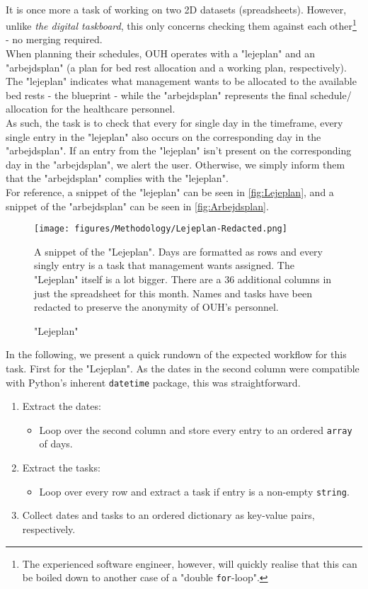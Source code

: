 \\
It is once more a task of working on two 2D datasets (spreadsheets). However, unlike \emph{the digital taskboard}, this only concerns checking them against each other\footnote{The experienced software engineer, however, will quickly realise that this can be boiled down to another case of a "double \texttt{for}-loop".} - no merging required.
\\
When planning their schedules, OUH operates with a "lejeplan" and an "arbejdsplan" (a plan for bed rest allocation and a working plan, respectively). The "lejeplan" indicates what management wants to be allocated to the available bed rests - the blueprint - while the "arbejdsplan" represents the final schedule/ allocation for the healthcare personnel. 
\\
As such, the task is to check that every for single day in the timeframe, every single entry in the "lejeplan" also occurs on the corresponding day in the "arbejdsplan". If an entry from the "lejeplan" isn't present on the corresponding day in the "arbejdsplan", we alert the user. Otherwise, we simply inform them that the "arbejdsplan" complies with the "lejeplan".
\\
For reference, a snippet of the "lejeplan" can be seen in \autoref{fig:Lejeplan}, and a snippet of the "arbejdsplan" can be seen in \autoref{fig:Arbejdsplan}.
\begin{figure}[H]
    \centering
    \texttt{[image: figures/Methodology/Lejeplan-Redacted.png]}
    \caption{"Lejeplan"}
    \small
    \raggedright 
    A snippet of the "Lejeplan". Days are formatted as rows and every singly entry is a task that management wants assigned. The "Lejeplan" itself is a lot bigger. There are a \(36\) additional columns in just the spreadsheet for this month. Names and tasks have been redacted to preserve the anonymity of OUH's personnel.
    \label{fig:Lejeplan}
\end{figure}

In the following, we present a quick rundown of the expected workflow for this task. First for the "Lejeplan". As the dates in the second column were compatible with Python's inherent \texttt{datetime} package, this was straightforward.
\begin{enumerate}
	\item Extract the dates:
		\begin{itemize}
			\item Loop over the second column and store every entry to an ordered \texttt{array} of days.	
		\end{itemize}
	\item Extract the tasks:
		\begin{itemize}
			\item Loop over every row and extract a task if entry is a non-empty \texttt{string}.	
		\end{itemize}
	\item Collect dates and tasks to an ordered \gls{dictionary} as key-value pairs, respectively.
\end{enumerate}


